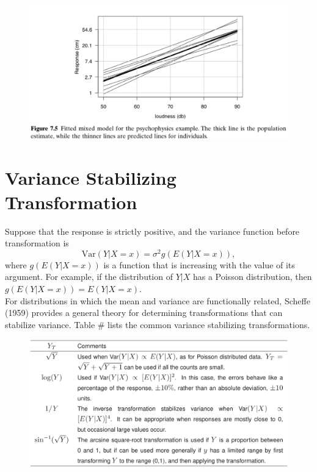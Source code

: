 \documentclass[14pt]{extarticle}
\begin{document}
\begin{figure}[H]
    \centering
    \includegraphics[width=1\textwidth]{fig13.png}
\end{figure} 
\section*{Variance Stabilizing Transformation}
\noindent
Suppose that the response is strictly positive, and the variance function before transformation is
\[
\text{Var}(Y | X = x) = \sigma^2 g(E(Y | X = x)),
\]
where \( g(E(Y | X = x)) \) is a function that is increasing with the value of its argument. For example, if the distribution of \( Y | X \) has a Poisson distribution, then \( g(E(Y | X = x)) = E(Y | X = x) \).\\
For distributions in which the mean and variance are functionally related, Scheffe (1959) provides a general theory for determining transformations that can stabilize variance. Table \# lists the common variance stabilizing transformations.
\begin{figure}[H]
    \centering
    \includegraphics[width=1\textwidth]{fig14.png}
\end{figure} 
\end{document}
